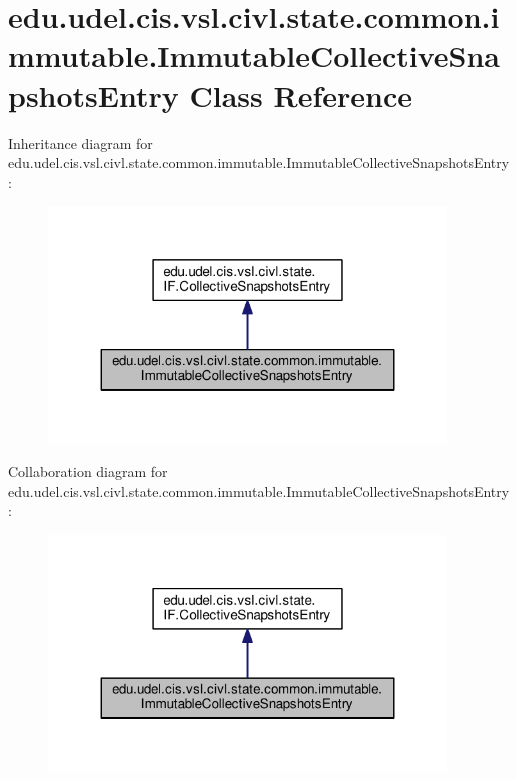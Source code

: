 \hypertarget{classedu_1_1udel_1_1cis_1_1vsl_1_1civl_1_1state_1_1common_1_1immutable_1_1ImmutableCollectiveSnapshotsEntry}{}\section{edu.\+udel.\+cis.\+vsl.\+civl.\+state.\+common.\+immutable.\+Immutable\+Collective\+Snapshots\+Entry Class Reference}
\label{classedu_1_1udel_1_1cis_1_1vsl_1_1civl_1_1state_1_1common_1_1immutable_1_1ImmutableCollectiveSnapshotsEntry}


Inheritance diagram for edu.\+udel.\+cis.\+vsl.\+civl.\+state.\+common.\+immutable.\+Immutable\+Collective\+Snapshots\+Entry\+:
\nopagebreak
\begin{figure}[H]
\begin{center}
\leavevmode
\includegraphics[width=299pt]{classedu_1_1udel_1_1cis_1_1vsl_1_1civl_1_1state_1_1common_1_1immutable_1_1ImmutableCollectiveSnapshotsEntry__inherit__graph}
\end{center}
\end{figure}


Collaboration diagram for edu.\+udel.\+cis.\+vsl.\+civl.\+state.\+common.\+immutable.\+Immutable\+Collective\+Snapshots\+Entry\+:
\nopagebreak
\begin{figure}[H]
\begin{center}
\leavevmode
\includegraphics[width=299pt]{classedu_1_1udel_1_1cis_1_1vsl_1_1civl_1_1state_1_1common_1_1immutable_1_1ImmutableCollectiveSnapshotsEntry__coll__graph}
\end{center}
\end{figure}
